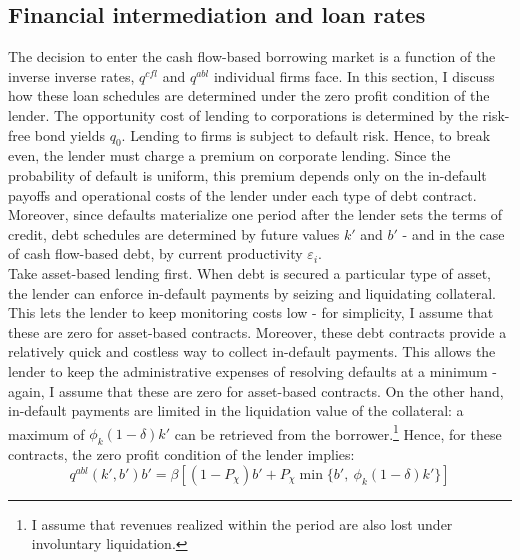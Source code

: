 \documentclass[12pt]{article}
\begin{document}
\subsection{Financial intermediation and loan rates \label{sec:loan rates}}
The decision to enter the cash flow-based borrowing market is a function of the inverse inverse rates, $q^{cfl}$ and $q^{abl}$ individual firms face. In this section, I discuss how these loan schedules are determined under the zero profit condition of the lender. 
The opportunity cost of lending to corporations is determined by the risk-free bond yields $q_0$. Lending to firms is subject to default risk. Hence, to break even, the lender must charge a premium on corporate lending. Since the probability of default is uniform, this premium depends only on the in-default payoffs and operational costs of the lender under each type of debt contract. Moreover, since defaults materialize one period after the lender sets the terms of credit, debt schedules are determined by future values $k'$ and $b'$ - and in the case of cash flow-based debt, by current productivity $\varepsilon_i$. 
\vspace{3mm} \\
Take asset-based lending first. When debt is secured a particular type of asset, the lender can enforce in-default payments by seizing and liquidating collateral. This lets the lender to keep monitoring costs low - for simplicity, I assume that these are zero for asset-based contracts. Moreover, these debt contracts provide a relatively quick and costless way to collect in-default payments. This allows the lender to keep the administrative expenses of resolving defaults at a minimum - again, I assume that these are zero for asset-based contracts. On the other hand, in-default payments are limited in the liquidation value of the collateral: a maximum of $\phi_k (1-\delta) k'$ can be retrieved from the borrower.\footnote{I assume that revenues realized within the period are also lost under involuntary liquidation.} Hence, for these contracts, the zero profit condition of the lender implies: 
\begin{equation} \label{eq:q_abl}
 q^{abl}(k',b')b' = \beta \left[ (1-P_\chi) b' + P_\chi \min\{b', \ \phi_k (1-\delta) k' \} \right]  
\end{equation}
\end{document}
